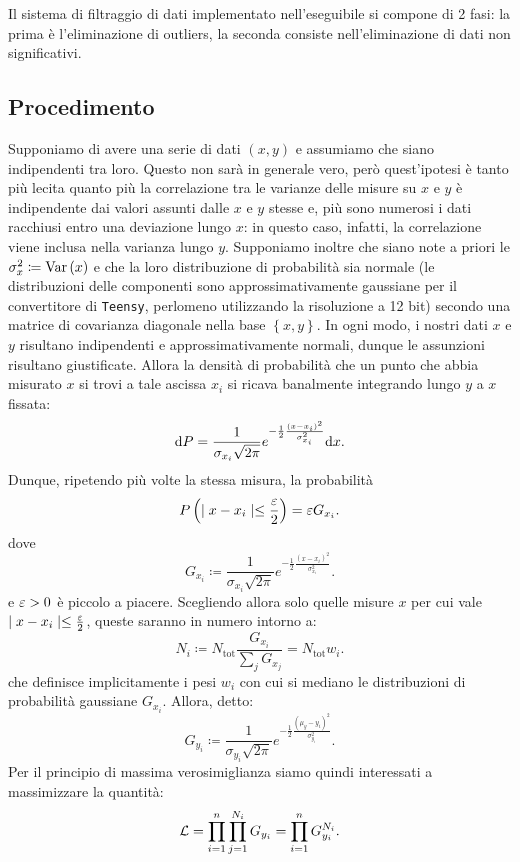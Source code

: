 \documentclass{article}[a4paper, oneside, 11pt]
\begin{document}
Il sistema di filtraggio di dati implementato nell'eseguibile si compone di 2
fasi: la prima è l’eliminazione di outliers, la seconda consiste
nell'eliminazione di dati non significativi.

\subsection{Procedimento}
Supponiamo di avere una serie di dati $(x, y)$ e assumiamo che siano
indipendenti tra loro. Questo non sarà in generale vero, però quest'ipotesi
è tanto più lecita quanto più la correlazione tra le varianze delle misure su
$x$ e $y$ è indipendente dai valori assunti dalle $x$ e $y$ stesse e, più
sono numerosi i dati racchiusi entro una deviazione lungo $x$: in questo caso,
infatti, la correlazione viene inclusa nella varianza lungo $y$.
Supponiamo inoltre che siano note a priori le $\sigma_x ^2 \coloneqq \text{Var}\left(x\right)$
e che la loro distribuzione di probabilità sia normale (le distribuzioni
delle componenti sono approssimativamente gaussiane per il convertitore
di \verb+Teensy+, perlomeno utilizzando la risoluzione a 12 bit) secondo una 
matrice
di covarianza diagonale nella base $\left\{x, y\right\}$.
In ogni modo, i nostri dati $x$ e $y$ risultano indipendenti e
approssimativamente normali, dunque le assunzioni risultano giustificate. 
Allora la densità di probabilità che un punto che abbia misurato $x$ si trovi
a tale ascissa $x_i$ si ricava banalmente integrando lungo $y$ a $x$ fissata:
\[
	\mathrm{d} P = \frac{1}{\sigma_{x_i} \sqrt{2\pi}}
	e^{-\frac{1}{2}{\frac{(x - x_i)^2}{\sigma_{x_i}^2}}} \mathrm{d} x
.\] 
Dunque, ripetendo più volte la stessa misura, la probabilità
\[
	P\left(\mid x - x_i \mid \leq \frac{\varepsilon}{2} \right) = \varepsilon G_{x_i} 
.\]
dove \[
	G_{x_i} \coloneqq \frac{1}{\sigma_{x_i} \sqrt{2\pi}}
	e^{-\frac{1}{2}{\frac{(x - x_i)^2}{\sigma_{x_i}^2}}}
.\] 
e $\varepsilon > 0$ è piccolo a piacere. Scegliendo allora solo quelle misure $x$ per
cui vale $\mid x - x_i \mid \leq \frac{\varepsilon}{2}$, queste saranno in numero
intorno a:
\[
	N_i \coloneqq N_{\text{tot}} \frac{G_{x_i}}{\sum_j G_{x_j}} =
		N_{\text{tot}} w_i
.\] 
che definisce implicitamente i pesi $w_i$ con cui si mediano le distribuzioni
di probabilità gaussiane $G_{x_i}$.
Allora, detto:
\[
	G_{y_i} \coloneqq \frac{1}{\sigma_{y_i} \sqrt{2\pi}}
	e^{-\frac{1}{2}{\frac{(\mu_y - y_i)^2}{\sigma_{y_i}^2}}}
.\] 
Per il principio di massima verosimiglianza siamo quindi interessati a
massimizzare la quantità:
\[
	\mathcal L = \prod_{i=1}^{n} \prod_{j=1}^{N_i} G_{y_i} = 
	\prod_{i=1}^{n} G_{y_i}^{N_i}
.\] 
\end{document}
